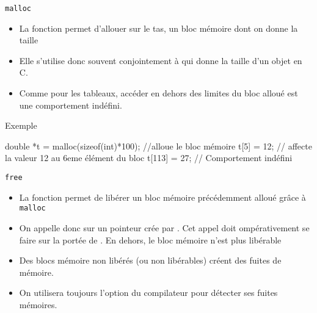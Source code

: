 \documentclass[10pt]{beamer}
\begin{document}
\begin{frame}[fragile]{\Ctitle}{\stitle}
	\begin{alertblock}{{\tt malloc}}
		\begin{itemize}
			\item<1-> La fonction  permet d'allouer sur le tas, un bloc mémoire dont on donne la taille
			\item<2-> Elle s'utilise donc souvent conjointement à  qui donne la taille d'un objet en C.
			\item<3-> Comme pour les tableaux, accéder en dehors des limites du bloc alloué est une comportement indéfini.
		\end{itemize}
	\end{alertblock}
	\begin{exampleblock}{Exemple}
		\onslide<4->
		\begin{langageC}
			double *t =  malloc(sizeof(int)*100); //alloue le bloc mémoire
			t[5] = 12; // affecte la valeur 12 au 6eme élément du bloc
			t[113] = 27; // Comportement indéfini
		\end{langageC}
	\end{exampleblock}
\end{frame}

\begin{frame}[fragile]{\Ctitle}{\stitle}
	\begin{alertblock}{{\tt free}}
		\begin{itemize}
			\item<1-> La fonction  permet de libérer un bloc mémoire précédemment alloué grâce à {\tt malloc}
			\item<2-> On appelle donc  sur un pointeur crée  par . Cet appel doit ompérativement se faire sur la portée de . En dehors, le bloc mémoire n'est plus libérable
			\item<3-> Des blocs mémoire non libérés (ou non libérables) créent des fuites de mémoire.
			\item<4-> On utilisera toujours l'option  du compilateur pour détecter ses fuites mémoires.
		\end{itemize}
	\end{alertblock}
\end{frame}
\end{document}
